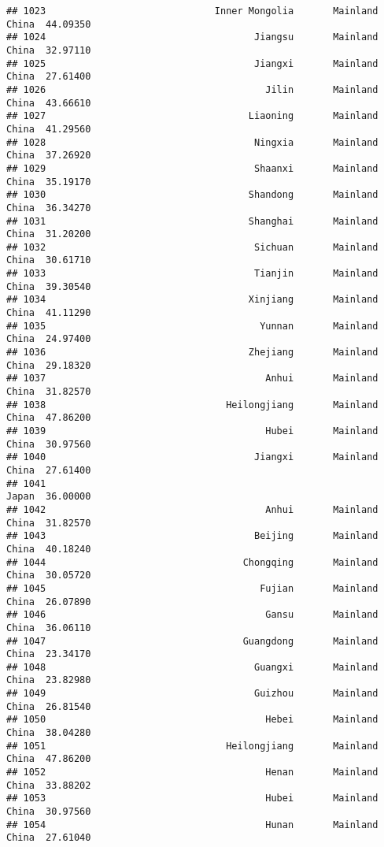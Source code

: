 \documentclass[
]{article}
\begin{document}
\begin{verbatim}
## 1023                              Inner Mongolia       Mainland China  44.09350
## 1024                                     Jiangsu       Mainland China  32.97110
## 1025                                     Jiangxi       Mainland China  27.61400
## 1026                                       Jilin       Mainland China  43.66610
## 1027                                    Liaoning       Mainland China  41.29560
## 1028                                     Ningxia       Mainland China  37.26920
## 1029                                     Shaanxi       Mainland China  35.19170
## 1030                                    Shandong       Mainland China  36.34270
## 1031                                    Shanghai       Mainland China  31.20200
## 1032                                     Sichuan       Mainland China  30.61710
## 1033                                     Tianjin       Mainland China  39.30540
## 1034                                    Xinjiang       Mainland China  41.11290
## 1035                                      Yunnan       Mainland China  24.97400
## 1036                                    Zhejiang       Mainland China  29.18320
## 1037                                       Anhui       Mainland China  31.82570
## 1038                                Heilongjiang       Mainland China  47.86200
## 1039                                       Hubei       Mainland China  30.97560
## 1040                                     Jiangxi       Mainland China  27.61400
## 1041                                                            Japan  36.00000
## 1042                                       Anhui       Mainland China  31.82570
## 1043                                     Beijing       Mainland China  40.18240
## 1044                                   Chongqing       Mainland China  30.05720
## 1045                                      Fujian       Mainland China  26.07890
## 1046                                       Gansu       Mainland China  36.06110
## 1047                                   Guangdong       Mainland China  23.34170
## 1048                                     Guangxi       Mainland China  23.82980
## 1049                                     Guizhou       Mainland China  26.81540
## 1050                                       Hebei       Mainland China  38.04280
## 1051                                Heilongjiang       Mainland China  47.86200
## 1052                                       Henan       Mainland China  33.88202
## 1053                                       Hubei       Mainland China  30.97560
## 1054                                       Hunan       Mainland China  27.61040

\end{verbatim}
\end{document}
